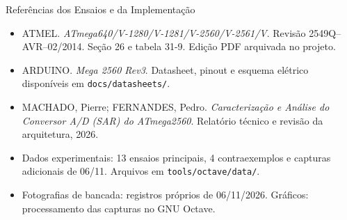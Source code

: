 \begin{frame}{Referências dos Ensaios e da Implementação}
\small
\begin{itemize}
\item ATMEL. \textit{ATmega640/V-1280/V-1281/V-2560/V-2561/V}. Revisão 2549Q--AVR--02/2014. Seção 26 e tabela 31-9. Edição PDF arquivada no projeto.
\item ARDUINO. \textit{Mega 2560 Rev3}. Datasheet, pinout e esquema elétrico disponíveis em \texttt{docs/datasheets/}.
\item MACHADO, Pierre; FERNANDES, Pedro. \textit{Caracterização e Análise do Conversor A/D (SAR) do ATmega2560}. Relatório técnico e revisão da arquitetura, 2026.
\item Dados experimentais: 13 ensaios principais, 4 contraexemplos e capturas adicionais de 06/11. Arquivos em \texttt{tools/octave/data/}.
\item Fotografias de bancada: registros próprios de 06/11/2026. Gráficos: processamento das capturas no GNU Octave.
\end{itemize}
\end{frame}
